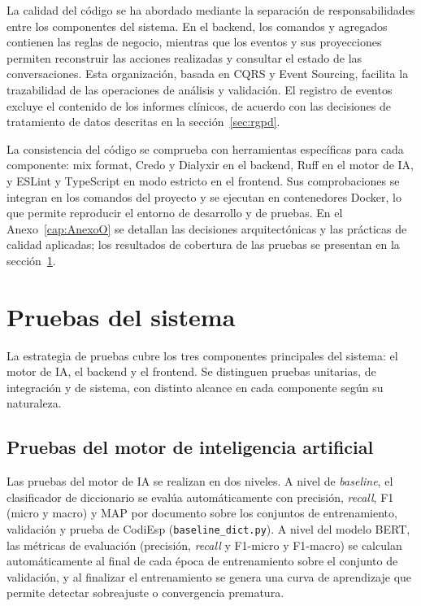 La calidad del código se ha abordado mediante la separación de responsabilidades entre los componentes del sistema. En el backend, los comandos y agregados contienen las reglas de negocio, mientras que los eventos y sus proyecciones permiten reconstruir las acciones realizadas y consultar el estado de las conversaciones. Esta organización, basada en CQRS y Event Sourcing, facilita la trazabilidad de las operaciones de análisis y validación. El registro de eventos excluye el contenido de los informes clínicos, de acuerdo con las decisiones de tratamiento de datos descritas en la sección~\ref{sec:rgpd}.

La consistencia del código se comprueba con herramientas específicas para cada componente: mix format, Credo y Dialyxir en el backend, Ruff en el motor de IA, y ESLint y TypeScript en modo estricto en el frontend. Sus comprobaciones se integran en los comandos del proyecto y se ejecutan en contenedores Docker, lo que permite reproducir el entorno de desarrollo y de pruebas. En el Anexo~\ref{cap:AnexoO} se detallan las decisiones arquitectónicas y las prácticas de calidad aplicadas; los resultados de cobertura de las pruebas se presentan en la sección~\ref{sec:pruebas}.


\section{Pruebas del sistema}
\label{sec:pruebas}

La estrategia de pruebas cubre los tres componentes principales del sistema: el motor de IA, el backend y el frontend. Se distinguen pruebas unitarias, de integración y de sistema, con distinto alcance en cada componente según su naturaleza.

\subsection{Pruebas del motor de inteligencia artificial}

Las pruebas del motor de IA se realizan en dos niveles. A nivel de \emph{baseline}, el clasificador de diccionario se evalúa automáticamente con precisión, \emph{recall}, F1 (micro y macro) y MAP por documento sobre los conjuntos de entrenamiento, validación y prueba de CodiEsp (\texttt{baseline\_dict.py}). A nivel del modelo BERT, las métricas de evaluación (precisión, \emph{recall} y F1-micro y F1-macro) se calculan automáticamente al final de cada época de entrenamiento sobre el conjunto de validación, y al finalizar el entrenamiento se genera una curva de aprendizaje que permite detectar sobreajuste o convergencia prematura.

